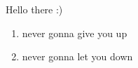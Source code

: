 \documentclass[a4paper,14pt]{article}
\begin{document}
Hello there :)
\begin{enumerate}
    \item{never gonna give you up}
    \item{never gonna let you down}
\end{enumerate}
\end{document}
